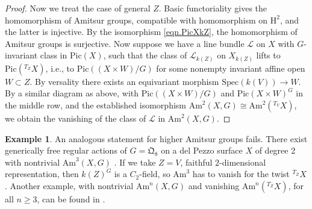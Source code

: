 \documentclass[12pt, reqno]{amsart}
\numberwithin{equation}{section}
\theoremstyle{plain}
\theoremstyle{definition}
\newtheorem{exam}[prop]{Example}
\def\cL{{\mathcal L}}
\def\rH{{\mathrm H}}
\def\Pic{\mathrm{Pic}}
\def\Am{\mathrm{Am}}
\def\Spec{\mathrm{Spec}}
\begin{document}
\begin{proof}
Now we treat the case of general $Z$.
Basic functoriality gives the homomorphism of Amitsur groups, compatible with homomorphism on $\rH^2$, and the latter is injective.
By the isomorphism \eqref{eqn.PicXkZ}, the homomorphism of
Amitsur groups is surjective.
Now suppose we have a line bundle $\cL$ on $X$ with $G$-invariant class in $\Pic(X)$, such that the class of $\cL_{k(Z)}$ on $X_{k(Z)}$
lifts to $\Pic({}^{T_Z}X)$, i.e., to
$\Pic((X\times W)/G)$ for some
nonempty invariant affine open $W\subset Z$.
By versality there exists an equivariant morphism
$\Spec(k(V))\to W$.
By a similar diagram as above, with
$\Pic((X\times W)/G)$ and $\Pic(X\times W)^G$ in the middle row,
and the established isomorphism $\Am^2(X,G)\cong \Am^2({}^{T_V}X)$,
we obtain the vanishing of the class of $\cL$ in $\Am^2(X,G)$.
\end{proof}


\begin{exam} 
An analogous statement for higher Amitsur groups fails.
There exist generically free regular actions of $G=\mathfrak{Q}_8$ on a del Pezzo surface $X$ of degree 2 with nontrivial $\mathrm{Am}^3(X,G)$ \cite{TZcohomological}.
If we take $Z=V$, faithful $2$-dimensional representation, then $k(Z)^G$ is a $C_2$-field, so
$\mathrm{Am}^3$ has to vanish for the twist ${}^{T_Z}X$.
Another example, with nontrivial $\mathrm{Am}^n(X,G)$ and vanishing $\Am^n({}^{T_Z}X)$, for all $n\ge 3$, can be found in \cite[Sect.\ 9]{STZ}. 
\end{exam}







 

\end{document}
